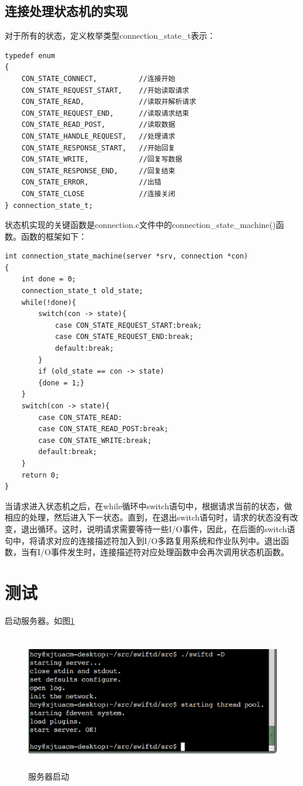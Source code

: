 \documentclass[twoside, xetex]{report}
\begin{document}
\subsection{连接处理状态机的实现}
	对于所有的状态，定义枚举类型connection\_state\_t表示：
\begin{lstlisting}	
typedef enum 
{
	CON_STATE_CONNECT, 			//连接开始 
	CON_STATE_REQUEST_START, 	//开始读取请求
	CON_STATE_READ, 			//读取并解析请求
	CON_STATE_REQUEST_END, 		//读取请求结束
	CON_STATE_READ_POST, 		//读取数据
	CON_STATE_HANDLE_REQUEST, 	//处理请求
	CON_STATE_RESPONSE_START, 	//开始回复
	CON_STATE_WRITE, 			//回复写数据
	CON_STATE_RESPONSE_END, 	//回复结束
	CON_STATE_ERROR, 			//出错
	CON_STATE_CLOSE 			//连接关闭
} connection_state_t;
\end{lstlisting}

	状态机实现的关键函数是connection.c文件中的connection\_state\_machine()函数。函数的框架如下：
\begin{lstlisting}	
int connection_state_machine(server *srv, connection *con)
{
	int done = 0;
	connection_state_t old_state;
	while(!done){	
		switch(con -> state){
			case CON_STATE_REQUEST_START:break;
			case CON_STATE_REQUEST_END:break;			
			default:break;
		}
		if (old_state == con -> state)
		{done = 1;}
	}
	switch(con -> state){
		case CON_STATE_READ:
		case CON_STATE_READ_POST:break;
		case CON_STATE_WRITE:break;
		default:break;
	}
	return 0;
}
\end{lstlisting}

	当请求进入状态机之后，在while循环中switch语句中，根据请求当前的状态，做相应的处理，然后进入下一状态。直到，在退出switch语句时，请求的状态没有改变，退出循环。这时，说明请求需要等待一些I/O事件，因此，在后面的switch语句中，将请求对应的连接描述符加入到I/O多路复用系统和作业队列中。退出函数，当有I/O事件发生时，连接描述符对应处理函数中会再次调用状态机函数。
	
\section{测试}
	启动服务器。如图\ref{startup}
	
	\begin{figure}[htbp]
	\centering
	\includegraphics[height=6cm, width=15cm]{pics/startup.eps}
	\caption{服务器启动}
	\label{startup}
	\end{figure}
	
\end{document}
